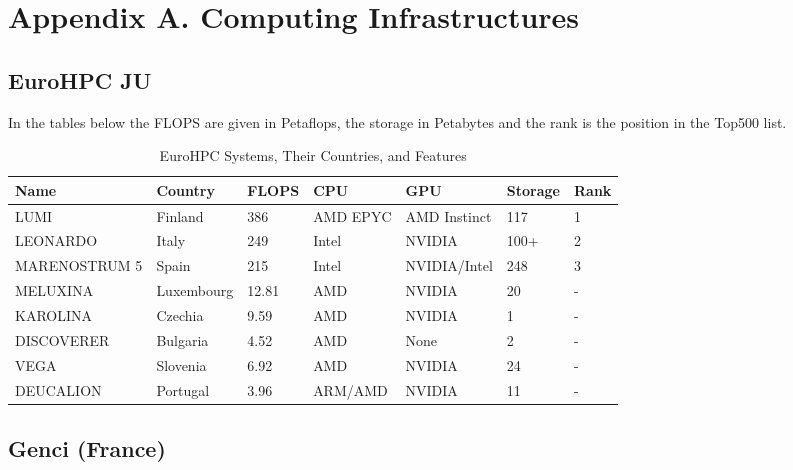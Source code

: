 
\clearpage
\appendix
\section*{Appendix A. Computing Infrastructures}
\label{sec:app:architectures}


\subsection*{EuroHPC JU}
\label{sec:arch:eurohpc-ju}

In the tables below the FLOPS are given in Petaflops, the storage in Petabytes and the rank is the position in the Top500 list.

\begin{table}[!ht]
    \centering
    \begin{tabular}{l l l l l l l}
    \toprule
    \textbf{Name} & \textbf{Country} & \textbf{FLOPS} & \textbf{CPU} & \textbf{GPU} & \textbf{Storage} & \textbf{Rank} \\
    \midrule
    LUMI & Finland & 386 & AMD EPYC & AMD Instinct & 117 & 1 \\
    LEONARDO & Italy & 249 & Intel & NVIDIA & 100+ & 2 \\
    MARENOSTRUM 5 & Spain & 215 & Intel & NVIDIA/Intel & 248 & 3 \\
    MELUXINA & Luxembourg & 12.81 & AMD & NVIDIA & 20 & - \\
    KAROLINA & Czechia & 9.59 & AMD & NVIDIA & 1 & - \\
    DISCOVERER & Bulgaria & 4.52 & AMD & None & 2 & - \\
    VEGA & Slovenia & 6.92 & AMD & NVIDIA & 24 & - \\
    DEUCALION & Portugal & 3.96 & ARM/AMD & NVIDIA & 11 & - \\
    \bottomrule
    \end{tabular}
    \caption{EuroHPC Systems, Their Countries, and Features}
    \end{table}

    \subsection*{Genci (France)}
\label{sec:arch:genci}

